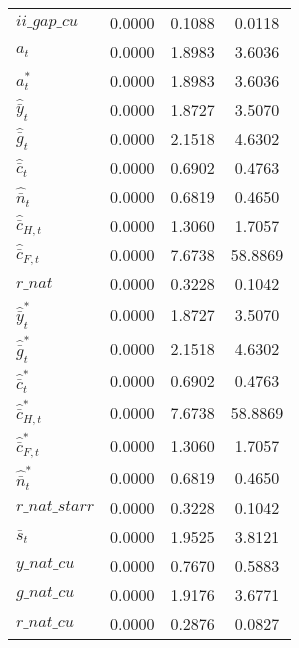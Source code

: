 \begin{center}
\begin{longtable}{lccc}
$ii\_gap\_cu              $	 & 	       0.0000	 & 	       0.1088	 & 	       0.0118 \\ 
${a_t}                    $	 & 	       0.0000	 & 	       1.8983	 & 	       3.6036 \\ 
${a_t^*}                  $	 & 	       0.0000	 & 	       1.8983	 & 	       3.6036 \\ 
${\hat {\bar y}_t}        $	 & 	       0.0000	 & 	       1.8727	 & 	       3.5070 \\ 
${\hat {\bar g}_t}        $	 & 	       0.0000	 & 	       2.1518	 & 	       4.6302 \\ 
${\hat {\bar c}_t}        $	 & 	       0.0000	 & 	       0.6902	 & 	       0.4763 \\ 
${\hat {\bar n}_t}        $	 & 	       0.0000	 & 	       0.6819	 & 	       0.4650 \\ 
${\hat {\bar c}_{H,t}}    $	 & 	       0.0000	 & 	       1.3060	 & 	       1.7057 \\ 
${\hat {\bar c}_{F,t}}    $	 & 	       0.0000	 & 	       7.6738	 & 	      58.8869 \\ 
$r\_nat                   $	 & 	       0.0000	 & 	       0.3228	 & 	       0.1042 \\ 
${\hat {\bar y}_t^*}      $	 & 	       0.0000	 & 	       1.8727	 & 	       3.5070 \\ 
${\hat {\bar g}_t^*}      $	 & 	       0.0000	 & 	       2.1518	 & 	       4.6302 \\ 
${\hat {\bar c}_t^*}      $	 & 	       0.0000	 & 	       0.6902	 & 	       0.4763 \\ 
${\hat {\bar c}_{H,t}^*}  $	 & 	       0.0000	 & 	       7.6738	 & 	      58.8869 \\ 
${\hat {\bar c}_{F,t}^*}  $	 & 	       0.0000	 & 	       1.3060	 & 	       1.7057 \\ 
${\hat {\bar n}_t^*}      $	 & 	       0.0000	 & 	       0.6819	 & 	       0.4650 \\ 
$r\_nat\_starr            $	 & 	       0.0000	 & 	       0.3228	 & 	       0.1042 \\ 
${\bar s_t}               $	 & 	       0.0000	 & 	       1.9525	 & 	       3.8121 \\ 
$y\_nat\_cu               $	 & 	       0.0000	 & 	       0.7670	 & 	       0.5883 \\ 
$g\_nat\_cu               $	 & 	       0.0000	 & 	       1.9176	 & 	       3.6771 \\ 
$r\_nat\_cu               $	 & 	       0.0000	 & 	       0.2876	 & 	       0.0827 \\ 

\end{longtable}
\end{center}
